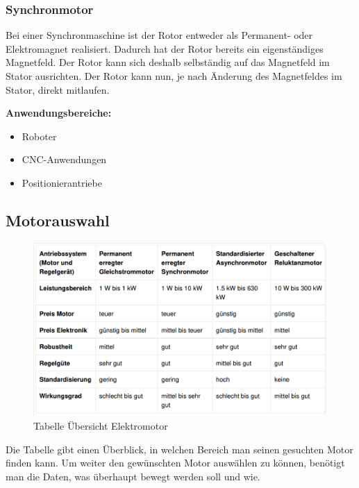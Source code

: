 \documentclass[12pt]{scrreprt} %
\begin{document}
\subsubsection{Synchronmotor}
\label{sec:synchronmotor}

Bei einer Synchronmaschine ist der Rotor entweder als Permanent- oder Elektromagnet realisiert. Dadurch hat der Rotor bereits ein eigenständiges Magnetfeld. Der Rotor kann sich deshalb selbständig auf das Magnetfeld im Stator ausrichten. Der Rotor kann nun, je nach Änderung des Magnetfeldes im Stator, direkt mitlaufen. 

\textbf{Anwendungsbereiche:}

\begin{itemize}
	\item{Roboter}
	\item{CNC-Anwendungen}
	\item{Positionierantriebe}
\end{itemize}



\subsection{Motorauswahl}
\label{sec:motorauswahl}

\begin{figure}[!ht]
\begin{center}
	\caption{Tabelle Übersicht Elektromotor}
	\includegraphics[width=1\textwidth]{TabelleMotor}
\end{center}
\end{figure}

Die Tabelle gibt einen Überblick, in welchen Bereich man seinen gesuchten Motor finden kann. 
Um weiter den gewünschten Motor auswählen zu können, benötigt man die Daten, was überhaupt bewegt werden soll und wie. 
\end{document}
